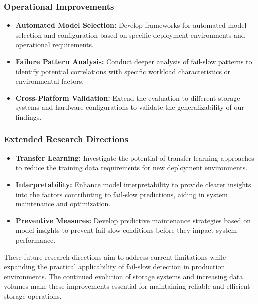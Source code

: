 \documentclass{article}
\begin{document}
\subsubsection{Operational Improvements}
\begin{itemize}
    \item \textbf{Automated Model Selection:} Develop frameworks for automated model selection and configuration based on specific deployment environments and operational requirements.
    
    \item \textbf{Failure Pattern Analysis:} Conduct deeper analysis of fail-slow patterns to identify potential correlations with specific workload characteristics or environmental factors.
    
    \item \textbf{Cross-Platform Validation:} Extend the evaluation to different storage systems and hardware configurations to validate the generalizability of our findings.
\end{itemize}

\subsubsection{Extended Research Directions}
\begin{itemize}
    \item \textbf{Transfer Learning:} Investigate the potential of transfer learning approaches to reduce the training data requirements for new deployment environments.
    
    \item \textbf{Interpretability:} Enhance model interpretability to provide clearer insights into the factors contributing to fail-slow predictions, aiding in system maintenance and optimization.
    
    \item \textbf{Preventive Measures:} Develop predictive maintenance strategies based on model insights to prevent fail-slow conditions before they impact system performance.
\end{itemize}

These future research directions aim to address current limitations while expanding the practical applicability of fail-slow detection in production environments. The continued evolution of storage systems and increasing data volumes make these improvements essential for maintaining reliable and efficient storage operations.

  
\end{document}
